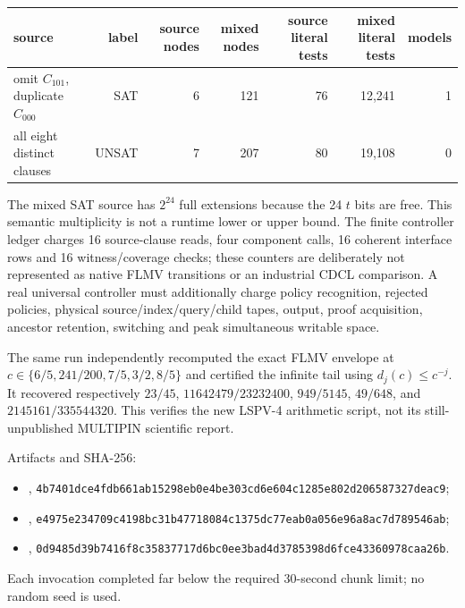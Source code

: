 \documentclass[11pt]{article}
\begin{document}
\begin{center}\small
\begin{tabular}{lrrrrrr}\toprule
source & label & source nodes & mixed nodes & source literal tests & mixed literal tests & models\\\midrule
omit $C_{101}$, duplicate $C_{000}$ & SAT&6&121&76&12,241&1\\
all eight distinct clauses & UNSAT&7&207&80&19,108&0\\\bottomrule
\end{tabular}
\end{center}
The mixed SAT source has $2^{24}$ full extensions because the 24 $t$ bits are
free.  This semantic multiplicity is not a runtime lower or upper bound.  The
finite controller ledger charges 16 source-clause reads, four component calls,
16 coherent interface rows and 16 witness/coverage checks; these counters are
deliberately not represented as native FLMV transitions or an industrial CDCL
comparison.  A real universal controller must additionally charge policy
recognition, rejected policies, physical source/index/query/child tapes, output,
proof acquisition, ancestor retention, switching and peak simultaneous writable
space.

The same run independently recomputed the exact FLMV envelope at
$c\in\{6/5,241/200,7/5,3/2,8/5\}$ and certified the infinite tail using
$d_j(c)\le c^{-j}$.  It recovered respectively
$23/45$, $11642479/23232400$, $949/5145$, $49/648$, and
$2145161/335544320$.  This verifies the new LSPV-4 arithmetic script, not its
still-unpublished MULTIPIN scientific report.

Artifacts and SHA-256:
\begin{itemize}
\item {},
\texttt{4b7401dce4fdb661ab15298eb0e4be303cd6e604c1285e802d206587327deac9};
\item {},
\texttt{e4975e234709c4198bc31b47718084c1375dc77eab0a056e96a8ac7d789546ab};
\item {},
\texttt{0d9485d39b7416f8c35837717d6bc0ee3bad4d3785398d6fce43360978caa26b}.
\end{itemize}
Each invocation completed far below the required 30-second chunk limit; no
random seed is used.
\end{document}
